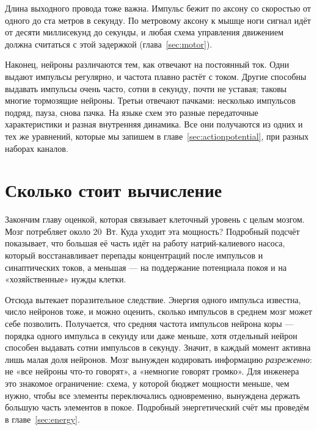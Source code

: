 Длина выходного провода тоже важна. Импульс бежит по аксону со скоростью от одного до ста метров в секунду. По метровому аксону к мышце ноги сигнал идёт от десяти миллисекунд до секунды, и любая схема управления движением должна считаться с этой задержкой (глава~\ref{sec:motor}).

Наконец, нейроны различаются тем, как отвечают на постоянный ток. Одни выдают импульсы регулярно, и частота плавно растёт с током. Другие способны выдавать импульсы очень часто, сотни в секунду, почти не уставая; таковы многие тормозящие нейроны. Третьи отвечают пачками: несколько импульсов подряд, пауза, снова пачка. На языке схем это разные передаточные характеристики и разная внутренняя динамика. Все они получаются из одних и тех же уравнений, которые мы запишем в главе~\ref{sec:actionpotential}, при разных наборах каналов.

\section{Сколько стоит вычисление}

Закончим главу оценкой, которая связывает клеточный уровень с целым мозгом. Мозг потребляет около $20$~Вт. Куда уходит эта мощность? Подробный подсчёт~\cite{AttwellLaughlin2001} показывает, что большая её часть идёт на работу натрий-калиевого насоса, который восстанавливает перепады концентраций после импульсов и синаптических токов, а меньшая --- на поддержание потенциала покоя и на «хозяйственные» нужды клетки.

Отсюда вытекает поразительное следствие. Энергия одного импульса известна, число нейронов тоже, и можно оценить, сколько импульсов в среднем мозг может себе позволить. Получается, что средняя частота импульсов нейрона коры --- порядка одного импульса в секунду или даже меньше, хотя отдельный нейрон способен выдавать сотни импульсов в секунду. Значит, в каждый момент активна лишь малая доля нейронов. Мозг вынужден кодировать информацию \emph{разреженно}: не «все нейроны что-то говорят», а «немногие говорят громко». Для инженера это знакомое ограничение: схема, у которой бюджет мощности меньше, чем нужно, чтобы все элементы переключались одновременно, вынуждена держать большую часть элементов в покое. Подробный энергетический счёт мы проведём в главе~\ref{sec:energy}.
